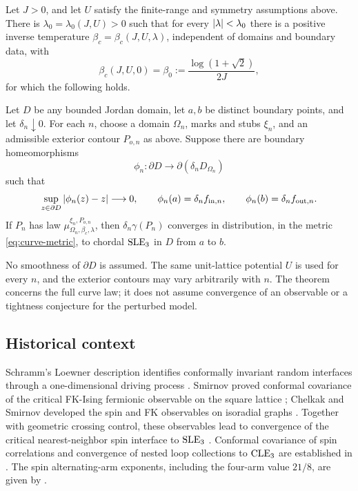 \begin{theorem}\label{thm:main}
Let \(J>0\), and let \(U\) satisfy the finite-range and symmetry assumptions
above. There is \(\lambda_0=\lambda_0(J,U)>0\) such that for every
\(\left|\lambda\right|<\lambda_0\) there is a positive inverse temperature
\(\beta_c=\beta_c(J,U,\lambda)\), independent of domains and boundary data,
with
\[
 \beta_c(J,U,0)=\beta_0:=\frac{\log(1+\sqrt2)}{2J},
\]
for which the following holds.

Let \(D\) be any bounded Jordan domain, let \(a,b\) be distinct boundary
points, and let \(\delta_n\downarrow0\). For each \(n\), choose a domain
\(\Omega_n\), marks and stubs \(\xi_n\), and an admissible exterior
contour \(P_{o,n}\) as above. Suppose there are boundary homeomorphisms
\[
 \phi_n:\partial D\longrightarrow
       \partial(\delta_n D_{\Omega_n})
\]
such that
\[
 \sup_{z\in\partial D}\left|\phi_n(z)-z\right|\longrightarrow0,\qquad
 \phi_n(a)=\delta_n f_{{\rm in},n},\qquad
 \phi_n(b)=\delta_n f_{{\rm out},n}.
\]
If \(P_n\) has law
\(\mu_{\Omega_n,\beta_c,\lambda}^{\xi_n,P_{o,n}}\), then
\(\delta_n\gamma(P_n)\) converges in distribution, in the metric
\eqref{eq:curve-metric}, to chordal \(\operatorname{SLE}_3\) in \(D\) from \(a\) to \(b\).
\end{theorem}

No smoothness of \(\partial D\) is assumed. The same unit-lattice
potential \(U\) is used for every \(n\), and the exterior contours may
vary arbitrarily with \(n\). The theorem concerns the full curve law;
it does not assume convergence of an observable or a tightness
conjecture for the perturbed model.

\subsection{Historical context}

Schramm's Loewner description identifies conformally invariant random
interfaces through a one-dimensional driving process
\citep{Schramm2000}. Smirnov proved conformal covariance of the critical
FK-Ising fermionic observable on the square lattice
\citep[Theorem~2.2]{Smirnov2010}; Chelkak and Smirnov developed the spin
and FK observables on isoradial graphs
\citep[Theorems~A--B]{ChelkakSmirnov2012}. Together with geometric
crossing control, these observables lead to convergence of the critical
nearest-neighbor spin interface to \(\operatorname{SLE}_3\)
\citep[Theorem~1]{CDHKS2014}. Conformal covariance of spin correlations
and convergence of nested loop collections to \(\operatorname{CLE}_3\) are established
in \citet{CHI2015,BH2019}. The spin alternating-arm exponents,
including the four-arm value \(21/8\), are given by \citet{Wu2018}.

